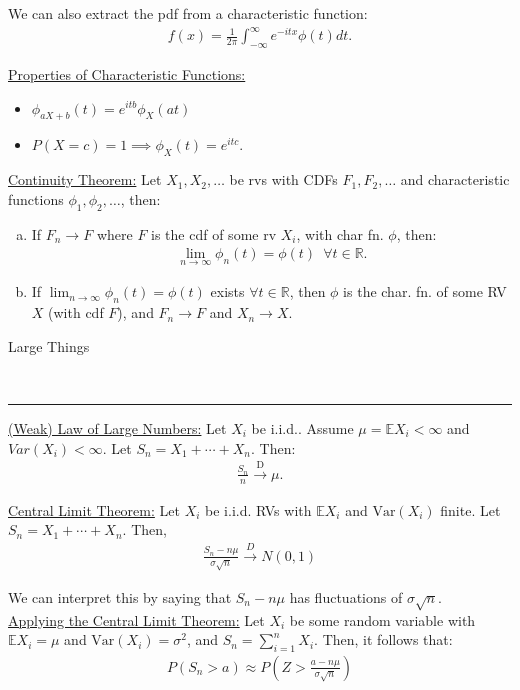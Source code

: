 \documentclass{article}
\newcommand{\header}[1]{\begin{large}\noindent #1\end{large}\\\rule{\textwidth}{0.5pt}}
\newcommand{\sheader}[1]{\underline{#1:}}
\newcommand{\gap}{\medskip\\}
\newcommand{\ds}{\displaystyle}
\begin{document}
We can also extract the pdf from a characteristic function:
\begin{align*}
    f(x) = \frac{1}{2\pi}\int_{-\infty}^{\infty} e^{-itx} \phi(t)dt.
\end{align*}

\sheader{Properties of Characteristic Functions}
\begin{itemize}
    \item $\ds\phi_{aX + b} (t) = e^{itb}\phi_X(at)$
    \item $P(X = c) = 1 \implies \phi_X(t) = e^{itc}$.
\end{itemize}

\sheader{Continuity Theorem} Let $X_1, X_2, \ldots $ be rvs with 
CDFs $F_1, F_2, \ldots$ and characteristic functions $\phi_1, \phi_2, \ldots$,
then:
\begin{enumerate}[(a)]
    \item If $F_n \to F$ where $F$ is the cdf of some rv $X_i$, 
    with char fn. $\phi$, then:
    \begin{align*}
        \lim_{n \to \infty}\phi_n(t) = \phi(t)\,\,\, \forall t \in \mathbb{R}.
    \end{align*}
    \item If $\ds \lim_{n \to \infty} \phi_n(t)= \phi(t)$ exists $\forall t \in \mathbb{R}$,
    then $\phi$ is the char. fn. of some RV $X$ (with cdf $F$), and 
    $F_n \to F$ and $X_n \to X$.
\end{enumerate}

\header{Large Things}

\sheader{(Weak) Law of Large Numbers} Let $X_i$ be i.i.d.. Assume 
$\mu = \mathbb{E}X_i < \infty$ and $Var(X_i) < \infty$. Let $S_n = X_1 + \cdots + X_n$.
Then:
\begin{align*}
    \frac{S_n}{n} \xrightarrow{\text{D}} \mu.
\end{align*}

\pagebreak

\sheader{Central Limit Theorem} Let $X_i$ be i.i.d. RVs with 
$\mathbb{E}X_i$ and $\textrm{Var}(X_i)$ finite. Let $S_n = X_1 + \cdots + X_n$.
Then,
\begin{align*}
    \frac{S_n - n \mu }{\sigma \sqrt{n}} \xrightarrow{D} N(0, 1)
\end{align*}

We can interpret this by saying that $S_n - n\mu $ has fluctuations of 
$\sigma \sqrt{n}$.
\gap
\sheader{Applying the Central Limit Theorem} Let $X_i$ be some random variable 
with $\mathbb{E}X_i = \mu$ and $\textrm{Var}(X_i) = \sigma^2$, and $S_n = \sum_{i=1}^{n}X_i$. 
Then, it follows that:
\begin{align*}
    P(S_n > a) \approx P\left(Z > \frac{a - n \mu}{\sigma \sqrt{n}}\right)
\end{align*}
\end{document}
